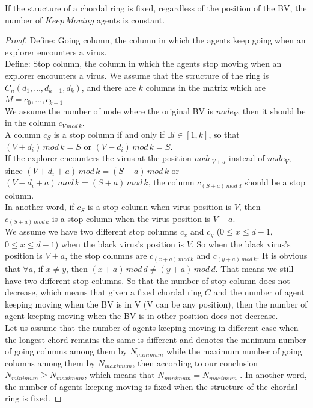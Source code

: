  \begin{theorem}
If the structure of a chordal ring is fixed, regardless of the position of the BV, the number of $Keep\,Moving$ agents is constant.
\end{theorem}
\begin{proof}


Define: Going column, the column in which the agents keep going when an explorer encounters a virus.\\
Define: Stop column, the column in which the agents stop moving when an explorer encounters a virus.
We assume that the structure of the ring is $C_n(d_1, \dots, d_{k-1}, d_k)$, and there are $k$ columns in the matrix which are $M={c_0, \dots, c_{k-1}}$\\
We assume the number of node where the original BV is $node_V$, then it should be in the column $c_{V\,mod\,k}$.\\
A column $c_S$ is a stop column if and only if $\exists i\in [1,k]$, so that $(V+d_i)\,mod\,k=S$ or $(V-d_i)\,mod\,k=S$.\\
If the explorer encounters the virus at the position $node_{V+a}$ instead of $node_V$, since $(V+d_i+a)\,mod\,k=(S+a)\,mod\,k$ or $(V-d_i+a)\,mod\,k=(S+a)\,mod\,k$, the column $c_{(S+a)\,mod\,d}$ should be a stop column.\\
In another word, if $c_S$ is a stop column when virus position is $V$, then $c_{(S+a)\,mod\,k}$ is a stop column when the virus position is $V+a$.\\
We assume we have two different stop columns $c_x$ and $c_y$ ($0\leq x\leq d-1$, $0\leq x\leq d-1$) when the black virus's position is $V$.  So when the black virus's position is $V+a$, the stop columns are $c_{(x+a)\,mod\,k}$ and $c_{(y+a)\,mod\,k}$. It is obvious that $\forall a$, if $x\neq y$, then $(x+a)\,mod\,d\neq(y+a)\,mod\,d$. That means we still have two different stop columns. So that the number of stop column does not decrease, which means that given a fixed chordal ring $C$ and the number of agent keeping moving when the BV is in V (V can be any position), then the number of agent keeping moving when the BV is in other position does not decrease.\\
Let us assume that the number of agents keeping moving in different case when the longest chord remains the same is different and denotes the minimum number of going columns among them by $N_{minimum}$ while the maximum number of going columns among them by $N_{maximum}$, then according to our conclusion $N_{minimum}\geq N_{maximum}$, which means that $N_{minimum}= N_{maximum}$ . In another word, the number of agents keeping moving is fixed when the structure of the chordal ring is fixed. 
\end{proof}


